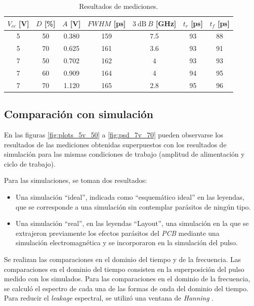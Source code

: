 \begin{table}
\centering
\begin{tabular}{ccccccc}
\hline
$V_{cc}$ [\unit{\volt}] & $D$ [\unit{\percent}] & $A$ [\unit{\volt}] &
    $FWHM$ [\unit{\pico\second}] & $\qty{3}{\dB} \ B$ [\unit{\giga\hertz}]& $t_r$
    [\unit{\pico\second}]& $t_f$ [\unit{\pico\second}]\\
\hline
5 & 50 & 0.380 & 159 & 7.5 & 93 & 88 \\
5 & 70 & 0.625 & 161 & 3.6 & 93 & 91 \\
7 & 50 & 0.702 & 162 & 4   & 93 & 93 \\
7 & 60 & 0.909 & 164 & 4   & 94 & 95 \\
7 & 70 & 1.120 & 165 & 2.8 & 95 & 96 \\
\hline
\end{tabular}
\caption{Resultados de mediciones.}
\label{tab:mediciones_resultados}
\end{table}

\subsection{Comparación con simulación}
\label{sec:comp_simulacion}

En las figuras \ref{fig:plots_5v_50} a \ref{fig:psd_7v_70} pueden observarse los resultados de las
mediciones obtenidas superpuestos con los resultados de simulación para las mismas condiciones de
trabajo (amplitud de alimentación y ciclo de trabajo).

Para las simulaciones, se toman dos resultados:

\begin{itemize}
    \item Una simulación ``ideal'', indicada como ``esquemático ideal'' en las
      leyendas, que se corresponde a una simulación sin contemplar parásitos de
      ningún tipo.
    \item Una simulación ``real'', en las leyendas ``Layout'', una simulación en
      la que se extrajeron previamente los efectos parásitos del \textit{PCB}
      mediante una simulación electromagnética y se incorporaron en la
      simulación del pulso.
\end{itemize}

Se realizan las comparaciones en el dominio del tiempo y de la frecuencia. Las
comparaciones en el dominio del tiempo consisten en la superposición del pulso
medido con los simulados. Para las comparaciones en el dominio de la frecuencia,
se calculó el espectro de cada una de las formas de onda del dominio del tiempo.
Para reducir el \textit{leakage} espectral, se utilizó una ventana de
\textit{Hanning} \cite{oppenheim1999dsp}.

